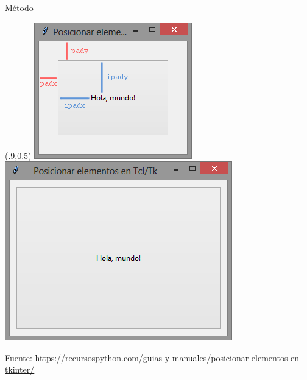 \documentclass[10pt, envcountsect , spanish]{beamer}
\begin{document}
\begin{frame}[fragile, label=pack]{Método }
\begin{textblock*}{.25\textwidth}(.9\textwidth,0.5\textheight)
\includegraphics[height=.23\textheight]{fig/padx-pady-ipadx-ipady-tkinter.png}\\
\includegraphics[height=.23\textheight]{fig/elemento-en-expansion-tkinter.png}\\
\end{textblock*}

{\tiny Fuente: \url{https://recursospython.com/guias-y-manuales/posicionar-elementos-en-tkinter/}}
\end{frame}
\end{document}
